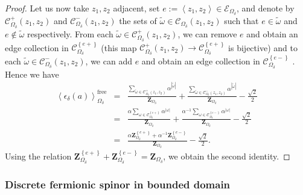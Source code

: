 \documentclass[oneside,english]{amsart}
\numberwithin{equation}{section}
\numberwithin{figure}{section}
\theoremstyle{plain}
\theoremstyle{plain}
\theoremstyle{plain}
\theoremstyle{plain}
\theoremstyle{plain}
\theoremstyle{definition}
\theoremstyle{remark}
\begin{document}
\begin{proof}
Let us now take $z_{1},z_{2}$ adjacent, set $e:=\left\langle z_{1},z_{2}\right\rangle \in\mathcal{E}_{\Omega_{\delta}}$,
and denote by $\mathcal{C}_{\Omega_{\delta}}^{+}\left(z_{1},z_{2}\right)$
and $\mathcal{C}_{\Omega_{\delta}}^{-}\left(z_{1},z_{2}\right)$ the
sets of $\tilde{\omega}\in\mathcal{C}_{\Omega_{\delta}}\left(z_{1},z_{2}\right)$
such that $e\in\tilde{\omega}$ and $e\notin\tilde{\omega}$ respectively.
From each $\tilde{\omega}\in\mathcal{C}_{\Omega_{\delta}}^{+}\left(z_{1},z_{2}\right)$,
we can remove $e$ and obtain an edge collection in $\mathcal{C}_{\Omega_{\delta}}^{\left\{ e+\right\} }$
(this map $\mathcal{C}_{\Omega_{\delta}}^{+}\left(z_{1},z_{2}\right)\to\mathcal{C}_{\Omega_{\delta}}^{\left\{ e+\right\} }$
is bijective) and to each $\tilde{\omega}\in\mathcal{C}_{\Omega_{\delta}}^{-}\left(z_{1},z_{2}\right)$,
we can add $e$ and obtain an edge collection in $\mathcal{C}_{\Omega_{\delta}}^{\left\{ e-\right\} }$
. Hence we have
\begin{eqnarray*}
\left\langle \epsilon_{\delta}\left(a\right)\right\rangle _{\Omega_{\delta}}^{\mathrm{free}} & = & \frac{\sum_{\tilde{\omega}\in\mathcal{C}_{\Omega_{\delta}}^{+}\left(z_{1},z_{2}\right)}\alpha^{\left|\tilde{\omega}\right|}}{\mathbf{Z}_{\Omega_{\delta}}}+\frac{\sum_{\tilde{\omega}\in\mathcal{C}_{\Omega_{\delta}}^{-}\left(z_{1},z_{2}\right)}\alpha^{\left|\tilde{\omega}\right|}}{\mathbf{Z}_{\Omega_{\delta}}}-\frac{\sqrt{2}}{2}\\
 & = & \frac{\alpha\sum_{\omega\in\mathcal{C}_{\Omega_{\delta}}^{\left\{ e+\right\} }}\alpha^{\left|\omega\right|}}{\mathbf{Z}_{\Omega_{\delta}}}+\frac{\alpha^{-1}\sum_{\omega\in\mathcal{C}_{\Omega_{\delta}}^{\left\{ e-\right\} }}\alpha^{\left|\omega\right|}}{\mathbf{Z}_{\Omega_{\delta}}}-\frac{\sqrt{2}}{2}\\
 & = & \frac{\alpha\mathbf{Z}_{\Omega_{\delta}}^{\left\{ e+\right\} }+\alpha^{-1}\mathbf{Z}_{\Omega_{\delta}}^{\left\{ e-\right\} }}{\mathbf{Z}_{\Omega_{\delta}}}-\frac{\sqrt{2}}{2}.
\end{eqnarray*}
Using the relation $\mathbf{Z}_{\Omega_{\delta}}^{\left\{ e+\right\} }+\mathbf{Z}_{\Omega_{\delta}}^{\left\{ e-\right\} }=\mathbf{Z}_{\Omega_{\delta}}$,
we obtain the second identity. 
\end{proof}

\subsubsection{Discrete fermionic  spinor in bounded domain}
\end{document}
